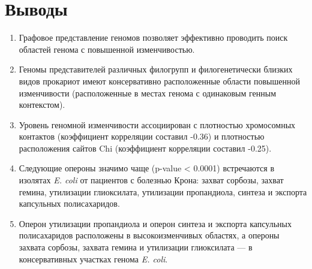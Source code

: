 \chapter{Выводы}

\begin{enumerate}
    \item Графовое представление геномов позволяет эффективно проводить поиск областей генома с повышенной изменчивостью.
  
      \item Геномы представителей различных филогрупп и филогенетически близких видов прокариот имеют консервативно расположенные области повышенной изменчивости (расположенные в местах генома с одинаковым генным контекстом).
  
       \item Уровень геномной изменчивости ассоциирован с плотностью хромосомных контактов (коэффициент корреляции составил -0.36) и плотностью расположения сайтов Chi (коэффициент корреляции составил -0.25).
  
      \item Следующие опероны значимо чаще (p-value < 0.0001) встречаются в изолятах \textit{E. coli} от пациентов с болезнью Крона: захват сорбозы, захват гемина, утилизации глиоксилата, утилизации пропандиола, синтеза и экспорта капсульных полисахаридов.
  
      \item Оперон утилизации пропандиола и оперон синтеза и экспорта капсульных полисахаридов расположены в высокоизменчивых областях, а опероны захвата сорбозы, захвата гемина и утилизации глиоксилата --- в консервативных участках генома \textit{E. coli}.
    
    \end{enumerate}